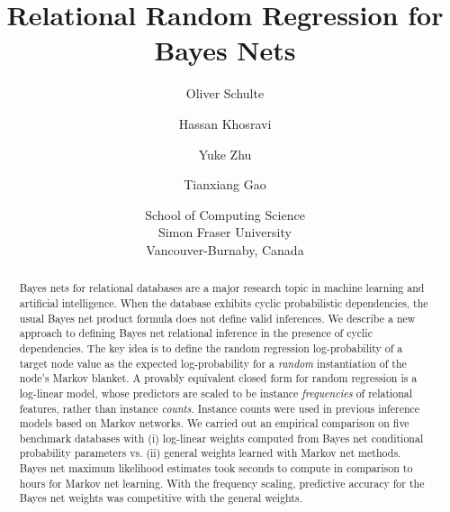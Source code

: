 \documentclass[twoside,leqno,twocolumn]{article}
\title{Relational Random Regression for Bayes Nets}
\author{Oliver Schulte \and Hassan Khosravi \and Yuke Zhu \and Tianxiang Gao  \\
\and 
School of Computing Science\\ Simon Fraser University\\Vancouver-Burnaby, Canada}
\begin{document}
\date{}
\maketitle

\begin{abstract} Bayes nets for relational databases are a major research topic in machine learning and artificial intelligence. When the database exhibits cyclic probabilistic dependencies, the usual Bayes net product formula does not define valid inferences. We describe a new approach to defining Bayes net relational inference in the presence of cyclic dependencies. The key idea is to define the random regression log-probability of a target node value  as the expected log-probability for a {\em random} instantiation of the node's Markov blanket. A provably equivalent closed form  for random regression is a log-linear model, whose predictors are scaled to be instance {\em frequencies} of relational features, rather than instance {\em counts}. Instance counts were used in previous inference models based on Markov networks. We carried out an empirical comparison on five benchmark databases with (i) log-linear weights computed from Bayes net conditional probability parameters vs. (ii) general weights learned with Markov net methods. Bayes net maximum likelihood estimates took seconds to compute  in comparison to hours for Markov net learning. With the frequency scaling, predictive accuracy for the Bayes net weights was competitive with the general weights.
\end{abstract}
 
 
\end{document}
